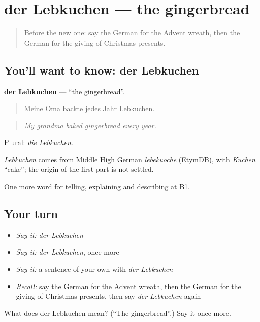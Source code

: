 \section[der Lebkuchen]{der Lebkuchen — the gingerbread}

\label{lesson:GE-C311-lebkuchen}



\begin{quote}
Before the new one: say the German for the Advent wreath, then the German for the giving of Christmas presents.
\end{quote}

\subsection*{You'll want to know: der Lebkuchen}
\textbf{der Lebkuchen} — \textquotedblleft{}the gingerbread\textquotedblright{}.

\begin{quote}
Meine Oma backte jedes Jahr Lebkuchen.
\end{quote}

\begin{quote}
\emph{My grandma baked gingerbread every year.}
\end{quote}

Plural: \emph{die Lebkuchen}.

\begin{cousinweb}
\emph{Lebkuchen} comes from Middle High German \emph{lebekuoche} (EtymDB), with \emph{Kuchen} \textquotedblleft{}cake\textquotedblright{}; the origin of the first part is not settled.
\end{cousinweb}

\begin{grammarlens}[title={What you've built}]
One more word for telling, explaining and describing at B1.
\end{grammarlens}

\subsection*{Your turn}
\begin{itemize}
\raggedright
  \item \emph{Say it:} \emph{der Lebkuchen}
  \item \emph{Say it:} \emph{der Lebkuchen}, once more
  \item \emph{Say it:} a sentence of your own with \emph{der Lebkuchen}
  \item \emph{Recall:} say the German for the Advent wreath, then the German for the giving of Christmas presents, then say \emph{der Lebkuchen} again
\end{itemize}

\begin{tcolorbox}[breakable,colback=teal!4,colframe=teal!35!black,title={Before you move on}]
What does der Lebkuchen mean? (\textquotedblleft{}The gingerbread\textquotedblright{}.) Say it once more.
\end{tcolorbox}
